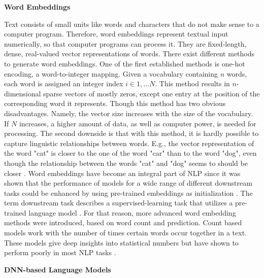 \textbf{Word Embeddings}
\label{sec:word_embeddings}

Text consists of small units like words and characters that do not make sense to a computer program. Therefore, word embeddings represent textual input numerically, so that computer programs can process it. They are fixed-length, dense, real-valued vector representations of words.
There exist different methods to generate word embeddings. One of the first established methods is one-hot encoding, a word-to-integer mapping. Given a vocabulary containing $n$ words, each word is assigned an integer index $i \in {1, \dots N}$. 
This method results in $n$-dimensional sparse vectors of mostly zeros, except one entry at the position of the corresponding word it represents. Though this method has two obvious disadvantages. Namely, the vector size increases with the size of the vocabulary. If $N$ increases, a higher amount of data, as well as computer power, is needed for processing. The second downside is that with this method, it is hardly possible to capture linguistic relationships between words. E.g., the vector representation of the word "cat" is closer to the one of the word "car" than to the word "dog", even though the relationship between the words "cat" and "dog" seems to should be closer \cite{rodriguez2018beyond}.
Word embeddings have become an integral part of NLP since it was shown that the performance of models for a wide range of different downstream tasks could be enhanced by using pre-trained embeddings as initialization \cite{mikolov2013efficient, pennington2014glove}. The term downstream task describes a supervised-learning task that utilizes a pre-trained language model \cite{alammar2018illustrated}. For that reason, more advanced word embedding methods were introduced, based on word count and prediction. Count based models work with the number of times certain words occur together in a text. These models give deep insights into statistical numbers but have shown to perform poorly in most NLP tasks \cite{neubig2016generalizing}.

 
\textbf{DNN-based Language Models}
\label{sec:DNN-based_Language_models}


